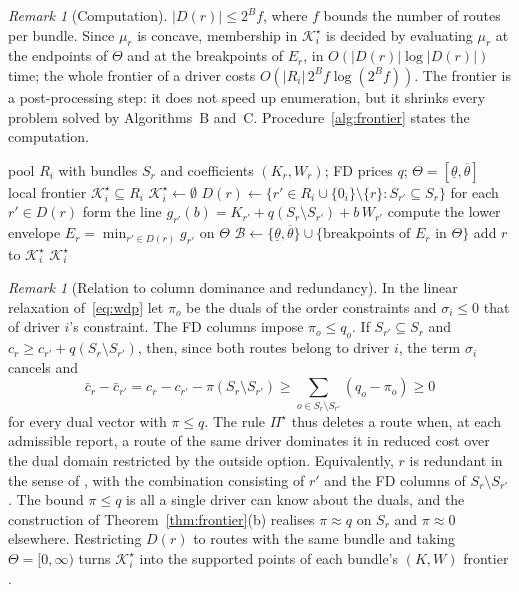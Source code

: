 \documentclass[review,12pt]{elsarticle}
\theoremstyle{definition}
\theoremstyle{remark}
\newtheorem{remark}[theorem]{Remark}
\newcommand{\Kstar}{\mathcal{K}^\star}
\newcommand{\lth}{\underline{\theta}}
\newcommand{\uth}{\overline{\theta}}
\begin{document}
\begin{remark}[Computation]
\label{rem:computation}
$|D(r)|\le 2^Bf$, where $f$ bounds the number of routes per bundle. Since
$\mu_r$ is concave, membership in $\Kstar_i$ is decided by evaluating
$\mu_r$ at the endpoints of $\Theta$ and at the breakpoints of $E_r$, in
$O(|D(r)|\log|D(r)|)$ time; the whole frontier of a driver costs
$O(|R_i|\,2^Bf\log(2^Bf))$. The frontier is a post-processing step: it does
not speed up enumeration, but it shrinks every problem solved by
Algorithms~B and~C. Procedure~\ref{alg:frontier} states the computation.
\end{remark}

\begin{algorithm}[!htbp]
\caption{\textsc{Frontier}$(R_i,q,\Theta)$: the rule $\Pi^\star$ for one driver}
\label{alg:frontier}
\begin{algorithmic}[1]
\Require pool $R_i$ with bundles $S_r$ and coefficients $(K_r,W_r)$; FD prices $q$; $\Theta=[\lth,\uth]$
\Ensure local frontier $\Kstar_i\subseteq R_i$
\State $\Kstar_i\gets\emptyset$
  \State $D(r)\gets\{r'\in R_i\cup\{0_i\}\setminus\{r\}:S_{r'}\subseteq S_r\}$
  \State for each $r'\in D(r)$ form the line $g_{r'}(b)=K_{r'}+q(S_r\setminus S_{r'})+b\,W_{r'}$
  \State compute the lower envelope $E_r=\min_{r'\in D(r)}g_{r'}$ on $\Theta$ 
  \State $\mathcal B\gets\{\lth,\uth\}\cup\{\text{breakpoints of }E_r\text{ in }\Theta\}$
   
    \State add $r$ to $\Kstar_i$
  \EndIf
\EndFor
\State \Return $\Kstar_i$
\end{algorithmic}
\end{algorithm}

\begin{remark}[Relation to column dominance and redundancy]
\label{rem:lp}
In the linear relaxation of~\eqref{eq:wdp} let $\pi_o$ be the duals of the
order constraints and $\sigma_i\le 0$ that of driver $i$'s constraint. The
FD columns impose $\pi_o\le q_o$. If $S_{r'}\subseteq S_r$ and
$c_r\ge c_{r'}+q(S_r\setminus S_{r'})$, then, since both routes belong to
driver $i$, the term $\sigma_i$ cancels and
\[
\bar c_r-\bar c_{r'}=c_r-c_{r'}-\pi(S_r\setminus S_{r'})
\ge\sum_{o\in S_r\setminus S_{r'}}(q_o-\pi_o)\ge 0
\]
for every dual vector with $\pi\le q$. The rule $\Pi^\star$ thus deletes a
route when, at each admissible report, a route of the same driver dominates
it in reduced cost over the dual domain restricted by the outside option.
Equivalently, $r$ is redundant in the sense of \citet{sol1994column}, with
the combination consisting of $r'$ and the FD columns of
$S_r\setminus S_{r'}$. The bound $\pi\le q$ is all a single driver can know
about the duals, and the construction of Theorem~\ref{thm:frontier}(b)
realises $\pi\approx q$ on $S_r$ and $\pi\approx 0$ elsewhere. Restricting
$D(r)$ to routes with the same bundle and taking $\Theta=[0,\infty)$ turns
$\Kstar_i$ into the supported points of each bundle's $(K,W)$ frontier
\citep{ehrgott2005multicriteria}.
\end{remark}
\end{document}
